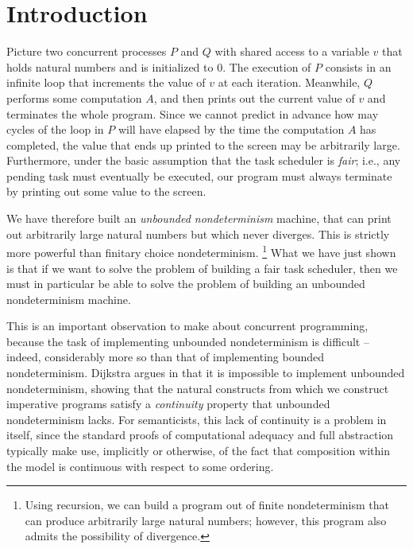 \documentclass[sigplan,9pt,review]{acmart}\settopmatter{printfolios=true,printccs=false,printacmref=false}
\begin{document}
\maketitle


\section{Introduction}

Picture two concurrent processes $P$ and $Q$ with shared access to a variable $v$ that holds natural numbers and is initialized to $0$.  
The execution of $P$ consists in an infinite loop that increments the value of $v$ at each iteration.  
Meanwhile, $Q$ performs some computation $A$, and then prints out the current value of $v$ and terminates the whole program.
Since we cannot predict in advance how may cycles of the loop in $P$ will have elapsed by the time the computation $A$ has completed, the value that ends up printed to the screen may be arbitrarily large.  
Furthermore, under the basic assumption that the task scheduler is \emph{fair}; i.e., any pending task must eventually be executed, our program must always terminate by printing out some value to the screen.  

We have therefore built an \emph{unbounded nondeterminism} machine, that can print out arbitrarily large natural numbers but which never diverges.  
This is strictly more powerful than finitary choice nondeterminism.
\footnote{Using recursion, we can build a program out of finite nondeterminism that can produce arbitrarily large natural numbers; however, this program also admits the possibility of divergence.}  
What we have just shown is that if we want to solve the problem of building a fair task scheduler, then we must in particular be able to solve the problem of building an unbounded nondeterminism machine.  

This is an important observation to make about concurrent programming, because the task of implementing unbounded nondeterminism is difficult -- indeed, considerably more so than that of implementing bounded nondeterminism.  
Dijkstra argues in \cite[Ch. 9]{DijkstraBook} that it is impossible to implement unbounded nondeterminism, showing that the natural constructs from which we construct imperative programs satisfy a \emph{continuity} property that unbounded nondeterminism lacks.  
For semanticists, this lack of continuity is a problem in itself, since the standard proofs of computational adequacy and full abstraction typically make use, implicitly or otherwise, of the fact that composition within the model is continuous with respect to some ordering.
\end{document}
